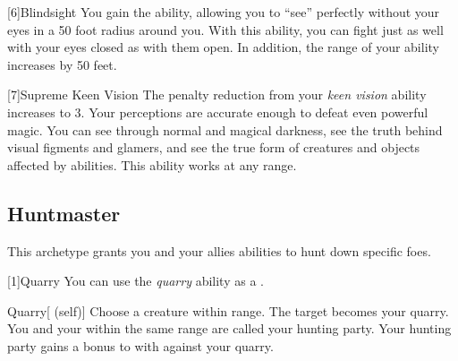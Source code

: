         [6]{Blindsight}
        You gain the  ability, allowing you to ``see'' perfectly without your eyes in a 50 foot radius around you.
        With this ability, you can fight just as well with your eyes closed as with them open.
        In addition, the range of your  ability increases by 50 feet.

        [7]{Supreme Keen Vision}
        The penalty reduction from your \textit{keen vision} ability increases to 3.
        Your perceptions are accurate enough to defeat even powerful magic.
        You can see through normal and magical darkness, see the truth behind visual figments and glamers, and see the true form of creatures and objects affected by  abilities.
        This ability works at any range.

    \subsection{Huntmaster}
        This archetype grants you and your allies abilities to hunt down specific foes.

        [1]{Quarry}\label{Quarry} You can use the \textit{quarry} ability as a .
        \begin{attuneability}{Quarry}[ (self)]
            Choose a creature within \rnglong range.
            The target becomes your quarry.
            You and your  within the same range are called your hunting party.
            Your hunting party gains a  bonus to  with  against your quarry.
        \end{attuneability}

